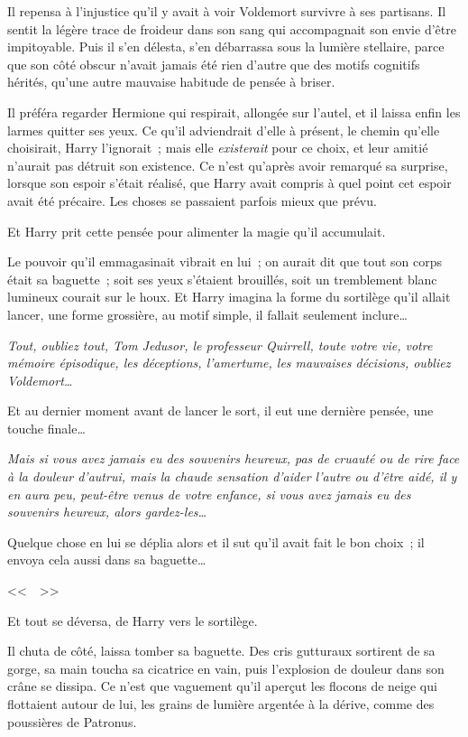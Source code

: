 Il repensa à l'injustice qu'il y avait à voir Voldemort survivre à ses partisans. Il sentit la légère trace de froideur dans son sang qui accompagnait son envie d'être impitoyable. Puis il s'en délesta, s'en débarrassa sous la lumière stellaire, parce que son côté obscur n'avait jamais été rien d'autre que des motifs cognitifs hérités, qu'une autre mauvaise habitude de pensée à briser.

Il préféra regarder Hermione qui respirait, allongée sur l'autel, et il laissa enfin les larmes quitter ses yeux. Ce qu'il adviendrait d'elle à présent, le chemin qu'elle choisirait, Harry l'ignorait~; mais elle \emph{existerait} pour ce choix, et leur amitié n'aurait pas détruit son existence. Ce n'est qu'après avoir remarqué sa surprise, lorsque son espoir s'était réalisé, que Harry avait compris à quel point cet espoir avait été précaire. Les choses se passaient parfois mieux que prévu.

Et Harry prit cette pensée pour alimenter la magie qu'il accumulait.

Le pouvoir qu'il emmagasinait vibrait en lui~; on aurait dit que tout son corps était sa baguette~; soit ses yeux s'étaient brouillés, soit un tremblement blanc lumineux courait sur le houx. Et Harry imagina la forme du sortilège qu'il allait lancer, une forme grossière, au motif simple, il fallait seulement inclure…

\emph{Tout, oubliez tout, Tom Jedusor, le professeur Quirrell, toute votre vie, votre mémoire épisodique, les déceptions, l'amertume, les mauvaises décisions, oubliez Voldemort…}

Et au dernier moment avant de lancer le sort, il eut une dernière pensée, une touche finale…

\emph{Mais si vous avez jamais eu des souvenirs heureux, pas de cruauté ou de rire face à la douleur d'autrui, mais la chaude sensation d'aider l'autre ou d'être aidé, il y en aura peu, peut-être venus de votre enfance, si vous avez jamais eu des souvenirs heureux, alors gardez-les…}

Quelque chose en lui se déplia alors et il sut qu'il avait fait le bon choix~; il envoya cela aussi dans sa baguette…

<<~\emph{}~>>

Et tout se déversa, de Harry vers le sortilège.

Il chuta de côté, laissa tomber sa baguette. Des cris gutturaux sortirent de sa gorge, sa main toucha sa cicatrice en vain, puis l'explosion de douleur dans son crâne se dissipa. Ce n'est que vaguement qu'il aperçut les flocons de neige qui flottaient autour de lui, les grains de lumière argentée à la dérive, comme des poussières de Patronus.

